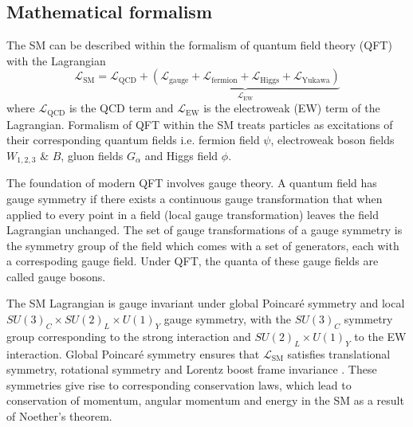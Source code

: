 \documentclass[../thesis.tex]{subfiles}
\begin{document}
\subsection{Mathematical formalism}
The \acs{SM} can be described within the formalism of quantum field theory (\acs{QFT}) with the Lagrangian
\begin{equation}
\mathcal{L}_\mathrm{SM} = \mathcal{L}_\mathrm{QCD} + {\underbrace{(\mathcal{L}_\mathrm{gauge}+\mathcal{L}_\mathrm{fermion}+\mathcal{L}_\mathrm{Higgs}+\mathcal{L}_\mathrm{Yukawa})}_{\mathcal{L}_\mathrm{EW}}}
\end{equation}
where $\mathcal{L}_\mathrm{QCD}$ is the \acs{QCD} term and $\mathcal{L}_\mathrm{EW}$ is the electroweak (\acs{EW}) term of the Lagrangian. Formalism of \acs{QFT} within the \acs{SM} treats particles as excitations \citep{theory:qft} of their corresponding quantum fields i.e. fermion field $\psi$, electroweak boson fields $W_{1,2,3}$ \& $B$, gluon fields $G_\alpha$ and Higgs field $\phi$.

The foundation of modern \acs{QFT} involves gauge theory. A quantum field has gauge symmetry if there exists a continuous gauge transformation that when applied to every point in a field (local gauge transformation) leaves the field Lagrangian unchanged. The set of gauge transformations of a gauge symmetry is the symmetry group of the field which comes with a set of generators, each with a correspoding gauge field. Under \acs{QFT}, the quanta of these gauge fields are called gauge bosons.

The \acs{SM} Lagrangian is gauge invariant under global Poincar\'e symmetry and local $SU(3)_C \times SU(2)_L \times U(1)_Y$ gauge symmetry, with the $SU(3)_C$ symmetry group corresponding to the strong interaction and $SU(2)_L \times U(1)_Y$ to the \acs{EW} interaction. Global Poincar\'e symmetry ensures that $\mathcal{L}_\mathrm{SM}$ satisfies translational symmetry, rotational symmetry and Lorentz boost frame invariance \citep{theory:symmetry}. These symmetries give rise to corresponding conservation laws, which lead to conservation of momentum, angular momentum and energy in the \acs{SM} as a result of Noether's theorem.
\end{document}
